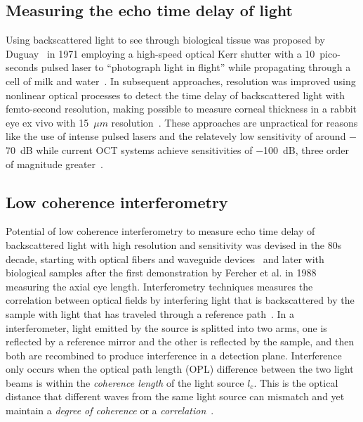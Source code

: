 \subsection{Measuring the echo time delay of light}

Using backscattered light to see through biological tissue was proposed by Duguay~\cite{Duguay1971_Light, Duguay1971_Ultrahigh} in 1971 employing a high-speed optical Kerr shutter with a 10~pico-seconds pulsed laser to ``photograph light in flight'' while propagating through a cell of milk and water~\cite{Duguay1971_Ultrahigh}. In subsequent approaches, resolution was improved using nonlinear optical processes to detect the time delay of backscattered light with femto-second resolution, making possible to measure corneal thickness in a rabbit eye ex vivo with 15~$\mu m$ resolution~\cite{Fujimoto1986_Femtosecond}. These approaches are unpractical for reasons like the use of intense pulsed lasers and the relatevely low  sensitivity of around $-$70~dB while current OCT systems achieve sensitivities of $-$100~dB, three order of magnitude greater~\cite{Fujimoto2015_Introduction}.

\subsection{Low coherence interferometry}

Potential of low coherence interferometry to measure echo time delay of backscattered light with high resolution and sensitivity was devised in the 80s decade, starting with optical fibers and waveguide devices~\cite{Takada1987_New, Youngquist1987_Optical} and later with biological samples after the first demonstration by Fercher et al. in 1988~\cite{Fercher1988_Eyelength} measuring the axial eye length. Interferometry techniques measures the correlation between optical fields by interfering light that is backscattered by the sample with light that has traveled through a reference path~\cite{Malacara2007_Optical}. In a interferometer, light emitted by the source is splitted into two arms, one is reflected by a reference mirror and the other is reflected by the sample, and then both are recombined to produce interference in a detection plane. Interference only occurs when the optical path length (OPL) difference between the two light beams is within the \textit{coherence length} of the light source $l_c$. This is the optical distance that different waves from the same light source can mismatch and yet maintain a \textit{degree of coherence} or a \textit{correlation}~\cite{Hecht2017_Optics}. %

